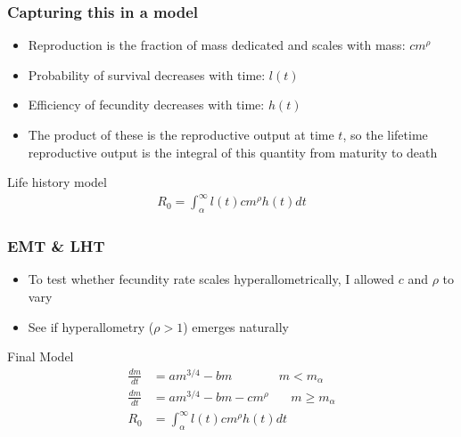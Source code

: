 \documentclass[handout]{beamer}
\begin{document}
\begin{frame}
	\frametitle{Capturing this in a model}
	\begin{itemize}
		\item Reproduction is the fraction of mass dedicated and scales with mass: $cm^{\rho}$
		\item Probability of survival decreases with time: $l(t)$
		\item Efficiency of fecundity decreases with time: $h(t)$
		\item The product of these is the reproductive output at time $t$, so the lifetime reproductive output is the integral of this quantity from maturity to death
	\end{itemize}
	\begin{block}{Life history model}
		\begin{align*}
			R_0 = \int_{\alpha}^{\infty}l(t)cm^{\rho}h(t) dt
		\end{align*}
	\end{block}
\end{frame}

\begin{frame}
	\frametitle{EMT \& LHT}
	\begin{itemize}
		\item To test whether fecundity rate scales hyperallometrically, I allowed $c$ and $\rho$ to vary
		\item See if hyperallometry ($\rho > 1$) emerges naturally
	\end{itemize}
	\begin{block}{Final Model}
		\begin{align*}
			\frac{dm}{dt} &= am^{3/4} - bm \ \ \ \ \ \ \ \ \ \ \ \ \ \ \ \ \ m < m_{\alpha}\\
			\frac{dm}{dt} &= am^{3/4} - bm - cm^{\rho} \ \ \ \ \  \ \ \ m \geq m_{\alpha}\\
			R_0 &= \int_{\alpha}^{\infty}l(t)cm^{\rho}h(t) dt
		\end{align*}
	\end{block}
\end{frame}
\end{document}
